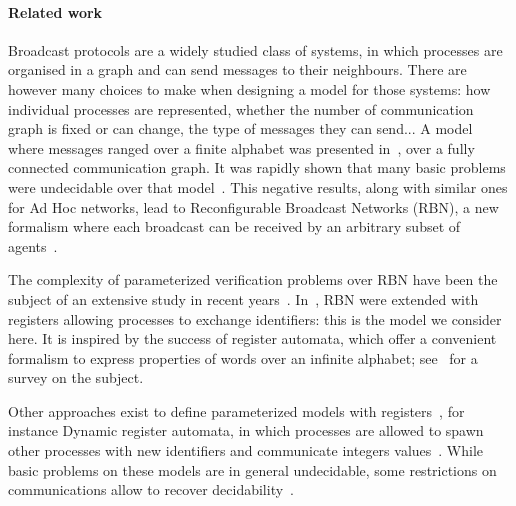 \paragraph*{Related work}

Broadcast protocols are a widely studied class of systems, in which processes are organised in a graph and can send messages to their neighbours. There are however many choices to make when designing a model for those systems: how individual processes are represented, whether the number of communication graph is fixed or can change, the type of messages they can send... 
A model where messages ranged over a finite alphabet was presented in~\cite{emerson1998model}, over a fully connected communication graph. It was rapidly shown that many basic problems were undecidable over that model~\cite{EsparzaFM1999verification}. This negative results, along with similar ones for Ad Hoc networks, lead to Reconfigurable Broadcast Networks (RBN), a new formalism where each broadcast can be received by an arbitrary subset of agents~\cite{DelzannoSZ2010Adhoc}.

The complexity of parameterized verification problems over RBN have been the subject of an extensive study in recent years~\cite{Delzanno2012complexity, BalasubramanianBM2018parameterized, BalasubramanianGW2022parameterized, ChiniMS2019liveness}. In~\cite{DST2013}, RBN were extended with registers allowing processes to exchange identifiers: this is the model we consider here. It is inspired by the success of register automata, which offer a convenient formalism to express properties of words over an infinite alphabet; see~\cite{segoufin2006automata} for a survey on the subject.

Other approaches exist to define parameterized models with registers~\cite{BRS21}, for instance Dynamic register automata, in which processes are allowed to spawn other processes with new identifiers and communicate integers values~\cite{AbdullaAKR2014verification}. While basic problems on these models are in general undecidable, some restrictions on communications allow to recover decidability~\cite{AbdullaAKR2015verification, Rezine2017verification}.


